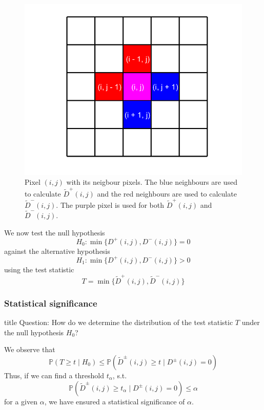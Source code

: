 \documentclass{beamer}
\begin{document}
\begin{frame}
	\begin{figure}
		\includegraphics[width=0.6\linewidth]{Testing/TestStatistic}
		\caption[Test Statistic]{Pixel $(i, j)$ with its neigbour pixels. The blue neighbours are used to calculate $\tilde{D}^+(i, j)$ and the red neighbours are used to calculate $\tilde{D}^-(i, j)$. The purple pixel is used for both $\tilde{D}^+(i, j)$ and $\tilde{D}^-(i, j)$.}
		\label{fig:TestStatistic}
	\end{figure}
\end{frame}

\begin{frame}
	We now test the null hypothesis $$H_0 : \min\{ D^+(i, j), D^-(i, j) \} = 0$$ against the alternative hypothesis $$H_1 : \min\{ D^+(i, j), D^-(i, j) \} > 0$$ using the test statistic $$T = \min \{ \tilde{D}^+(i, j), \tilde{D}^-(i, j) \}$$
\end{frame}

\subsubsection{Statistical significance}

\begin{frame}
	\begin{beamercolorbox}[sep=8pt,center,shadow=true,rounded=true]{title}
		Question: How do we determine the distribution of the test statistic $T$ under the null hypothesis $H_0$?
	\end{beamercolorbox}
\end{frame}

\begin{frame}
	We observe that
	\begin{equation*}
		\mathbb{P}(T \geq t \mid H_0) \leq \mathbb{P}(\tilde{D}^\pm(i, j) \geq t \mid D^\pm(i, j) = 0)
	\end{equation*}
	Thus, if we can find a threshold $t_\alpha$, s.t.
	\begin{equation*}
		\mathbb{P}(\tilde{D}^\pm(i, j) \geq t_\alpha \mid D^\pm(i, j) = 0) \leq \alpha
	\end{equation*}
	for a given $\alpha$, we have ensured a statistical significance of $\alpha$.
\end{frame}
\end{document}
